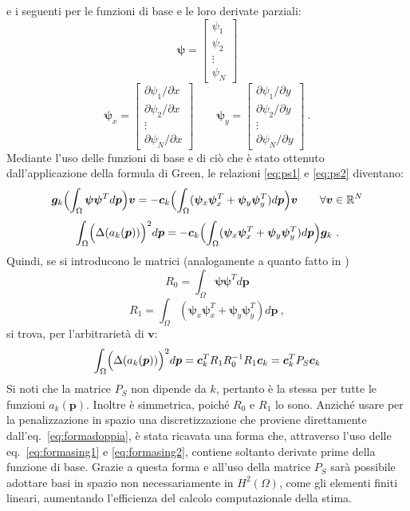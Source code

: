 \documentclass[a4paper,11pt,twoside,openright]{book}							%
\begin{document}
e i seguenti per le funzioni di base e le loro derivate parziali:
$$
\bm \psi =
\begin{bmatrix}
\psi_{1}  \\
\psi_{2}  \\
\vdots\\
\psi_{N}
\end{bmatrix}
$$
\begin{equation}
\bm \psi_x=  \begin{bmatrix}
\partial \psi_{1}/\partial x \\
\partial \psi_{2}/\partial x  \\
\vdots\\
\partial \psi_{N}/\partial x \end{bmatrix} 
\qquad
\bm \psi_y=  \begin{bmatrix}
\partial \psi_{1}/\partial y  \\
\partial \psi_{2}/\partial y  \\
\vdots\\
\partial \psi_{N}/\partial y\end{bmatrix} \ .
\end{equation}
Mediante l'uso delle funzioni di base e di ciò che è stato ottenuto dall'applicazione della formula di Green, le relazioni \eqref{eq:ps1} e \eqref{eq:ps2} diventano:
$$
\bm{g}_k \Bigl(\int_\Omega \bm \psi \bm \psi^T d \bm p\Bigr)\bm{v}=
-\bm{c}_k \Bigl(\int_\Omega (\bm \psi_x \bm \psi_x^T + \bm \psi_y \bm \psi_y^T)d \bm p\Bigr) \bm{v} \qquad \forall \bm{v} \in \mathbb{R}^N
$$
$$
\int_{\Omega} \Bigl( \Delta(  a_k(\bm p)  ) \Bigr)^2 d \bm p = -\bm{c}_k \Bigl(\int_\Omega (\bm \psi_x \bm \psi_x^T + \bm \psi_y \bm \psi_y^T) d \bm p\Bigr)\bm{g}_k \ .
$$
Quindi, se si introducono le matrici (analogamente a quanto fatto in \cite{art:sangalli})
$$ R_0 = \int_\Omega \bm \psi \bm \psi^T d \bm p$$
$$ R_1 = \int_\Omega (\bm \psi_x \bm \psi_x^T + \bm \psi_y \bm \psi_y^T)d \bm p \ ,$$
si trova, per l'arbitrarietà di $\bm v$:
\begin{equation}
\label{eq:pspace}
\int_{\Omega} \Bigl( \Delta(  a_k(\bm p)  ) \Bigr)^2 d \bm p = \bm{c}_k^T R_1 R_0^{-1} R_1 \bm{c}_k=\bm{c}_k^T P_S \bm{c}_k
\end{equation}
Si noti che la matrice $P_S$ non dipende da $k$, pertanto è la stessa per tutte le funzioni $a_k(\bm{p})$. Inoltre è simmetrica, poiché $R_0$ e $R_1$ lo sono.
Anziché usare per la penalizzazione in spazio una discretizzazione che proviene direttamente dall'eq.~\eqref{eq:formadoppia}, è stata ricavata una forma che, attraverso l'uso delle eq.~\eqref{eq:formasing1} e \eqref{eq:formasing2}, contiene soltanto derivate prime della funzione di base. Grazie a questa forma e all'uso della matrice $P_S$ sarà possibile adottare basi in spazio non necessariamente in $H^2(\Omega)$, come gli elementi finiti lineari, aumentando l'efficienza del calcolo computazionale della stima. 
\end{document}

